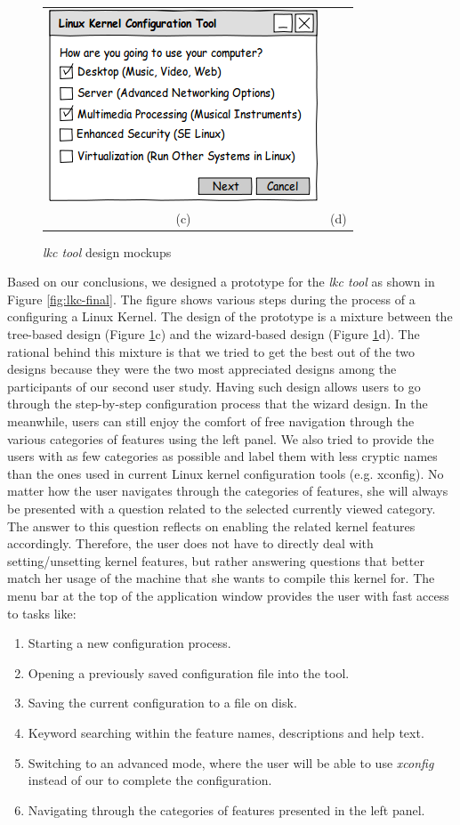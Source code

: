 \documentclass{chi2009}
\begin{document}
\begin{figure}[!t]
\begin{tabular}{SS}
 \includegraphics[scale=0.5,keepaspectratio=true]{figs/lkc-wizard} \\
 (c) & (d) \\
\end{tabular}
\caption{\textit{lkc tool} design mockups}
\label{fig:lkc-tool}
\end{figure}

Based on our conclusions, we designed a prototype for the \textit{lkc tool} as shown in Figure \ref{fig:lkc-final}. The figure shows various steps during the
process of a configuring a Linux Kernel. The design of the prototype is a mixture between the tree-based design (Figure \ref{fig:lkc-tool}c) and the
wizard-based design (Figure \ref{fig:lkc-tool}d). The rational behind this mixture is that we tried to get the best out of the two designs because they were
the two most appreciated designs among the participants of our second user study. Having such design allows users to go through the step-by-step configuration
process that the wizard design. In the meanwhile, users can still enjoy the comfort of free navigation through the various categories of features using the left
panel. We also tried to provide the users with as few categories as possible and label them with less cryptic names than the ones used in current Linux kernel
configuration tools (e.g. xconfig). No matter how the user navigates through the categories of features, she will always be presented with a question related
to the selected currently viewed category. The answer to this question reflects on enabling the related kernel features accordingly. Therefore, the user does
not have to directly deal with setting/unsetting kernel features, but rather answering questions that better match her usage of the machine that she wants to
compile this kernel for. The menu bar at the top of the application window provides the user with fast access to tasks like:
\begin{enumerate}
 \item Starting a new configuration process.
 \item Opening a previously saved configuration file into the tool.
 \item Saving the current configuration to a file on disk.
 \item Keyword searching within the feature names, descriptions and help text.
 \item Switching to an advanced mode, where the user will be able to use \textit{xconfig} instead of our to complete the configuration.
 \item Navigating through the categories of features presented in the left panel.
\end{enumerate}
\end{document}
